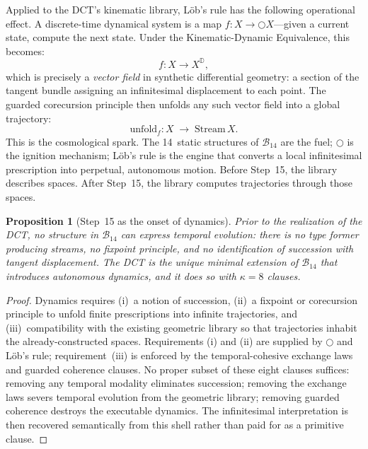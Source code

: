 \documentclass[11pt,a4paper]{article}
\theoremstyle{plain}
\newtheorem{proposition}[theorem]{Proposition}
\theoremstyle{definition}
\theoremstyle{remark}
\newcommand{\D}{\mathbb{D}}
\newcommand{\B}{\mathcal{B}}
\newcommand{\nextmod}{\bigcirc}
\newcommand{\Stream}{\mathrm{Stream}}
\newcommand{\unfold}{\mathrm{unfold}}
\begin{document}
Applied to the DCT's kinematic library, L\"ob's rule has the following operational effect.
A discrete-time dynamical system is a map $f : X \to \nextmod X$---given a current state, compute the next state.
Under the Kinematic-Dynamic Equivalence, this becomes:
\begin{equation}
\label{eq:vf}
    f : X \to X^{\D},
\end{equation}
which is precisely a \emph{vector field} in synthetic differential geometry: a section of the tangent bundle assigning an infinitesimal displacement to each point.
The guarded corecursion principle then unfolds any such vector field into a global trajectory:
\begin{equation}
\label{eq:unfold}
    \unfold_f : X \;\to\; \Stream\, X.
\end{equation}
This is the cosmological spark.
The 14~static structures of $\B_{14}$ are the fuel; $\nextmod$ is the ignition mechanism; L\"ob's rule is the engine that converts a local infinitesimal prescription into perpetual, autonomous motion.
Before Step~15, the library describes spaces.
After Step~15, the library computes trajectories through those spaces.

\begin{proposition}[Step~15 as the onset of dynamics]
\label{prop:onset}
Prior to the realization of the DCT, no structure in $\B_{14}$ can express temporal evolution: there is no type former producing streams, no fixpoint principle, and no identification of succession with tangent displacement.
The DCT is the \emph{unique minimal} extension of $\B_{14}$ that introduces autonomous dynamics, and it does so with $\kappa = 8$ clauses.
\end{proposition}

\begin{proof}
Dynamics requires (i)~a notion of succession, (ii)~a fixpoint or corecursion principle to unfold finite prescriptions into infinite trajectories, and (iii)~compatibility with the existing geometric library so that trajectories inhabit the already-constructed spaces.
Requirements (i) and (ii) are supplied by $\nextmod$ and L\"ob's rule; requirement~(iii) is enforced by the temporal-cohesive exchange laws and guarded coherence clauses.
No proper subset of these eight clauses suffices: removing any temporal modality eliminates succession; removing the exchange laws severs temporal evolution from the geometric library; removing guarded coherence destroys the executable dynamics.
The infinitesimal interpretation is then recovered semantically from this shell rather than paid for as a primitive clause.
\end{proof}
\end{document}
